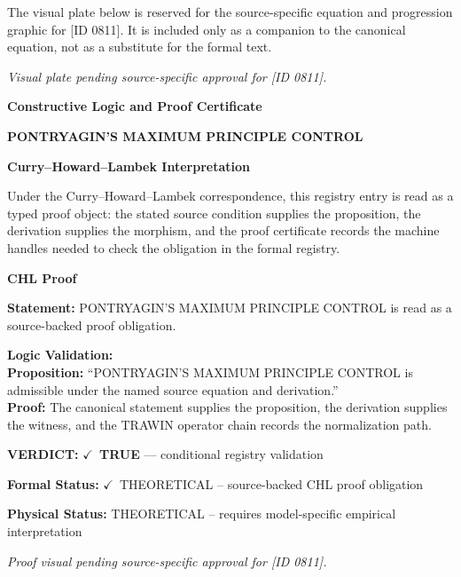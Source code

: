 \begingroup\footnotesize\sloppy
The visual plate below is reserved for the source-specific equation and progression graphic for [ID 0811]. It is included only as a companion to the canonical equation, not as a substitute for the formal text.
\par\endgroup
\begingroup\footnotesize\itshape
Visual plate pending source-specific approval for [ID 0811].
\par\endgroup

\clearpage
\begingroup\tzpsupportsetup
\noindent\textbf{\fontsize{10.8pt}{12.8pt}\selectfont [ID 0811] Constructive Logic and Proof Certificate}\par
\noindent\textbf{\fontsize{10pt}{12pt}\selectfont PONTRYAGIN'S MAXIMUM PRINCIPLE CONTROL}\par
\vspace{0.45em}
\begingroup
\footnotesize
\setlength{\parskip}{0.22em}
\setlength{\parindent}{0pt}
\noindent\textbf{Curry--Howard--Lambek Interpretation}\par
Under the Curry--Howard--Lambek correspondence, this registry entry is read as a typed proof
object: the stated source condition supplies the proposition, the derivation supplies the
morphism, and the proof certificate records the machine handles needed to check the obligation
in the formal registry.

\vspace{0.45em}
\noindent\textbf{CHL Proof}\par
\textbf{Statement:} PONTRYAGIN'S MAXIMUM PRINCIPLE CONTROL is read as a source-backed proof obligation.

\textbf{Logic Validation:}\\
\textbf{Proposition:} ``PONTRYAGIN'S MAXIMUM PRINCIPLE CONTROL is admissible under the named source equation and derivation.''\\
\textbf{Proof:} The canonical statement supplies the proposition, the derivation supplies the witness, and the TRAWIN operator chain records the normalization path.

\textbf{VERDICT:} \ensuremath{\checkmark}\ \textbf{TRUE} --- conditional registry validation

\textbf{Formal Status:} \ensuremath{\checkmark}\ THEORETICAL -- source-backed CHL proof obligation

\textbf{Physical Status:} THEORETICAL -- requires model-specific empirical interpretation
\par\vspace{0.45em}
\par
\vfill
\begingroup\footnotesize\itshape
Proof visual pending source-specific approval for [ID 0811].
\par\endgroup
\vfill
\endgroup
\endgroup
